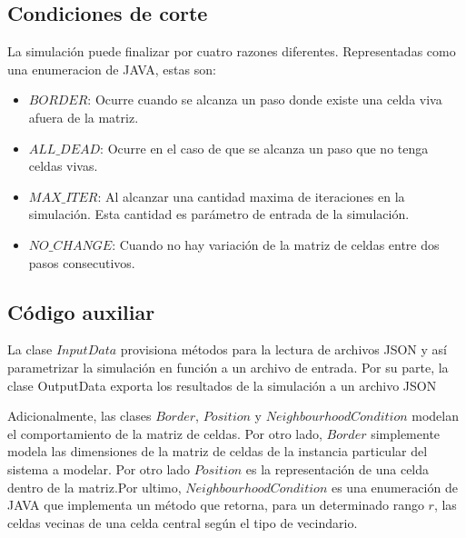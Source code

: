 \subsection{Condiciones de corte}\label{label:condiciones_de_corte}
    La simulación puede finalizar por cuatro razones diferentes. Representadas como una enumeracion de JAVA, estas son:
    \begin{itemize}
        \item $BORDER$: Ocurre cuando se alcanza un paso donde existe una celda viva afuera de la matriz.
        \item $ALL\_DEAD$: Ocurre en el caso de que se alcanza un paso que no tenga celdas vivas.
        \item $MAX\_ITER$: Al alcanzar una cantidad maxima de iteraciones en la simulación. Esta cantidad es parámetro de
            entrada de la simulación.
        \item $NO\_CHANGE$: Cuando no hay variación de la matriz de celdas entre dos pasos consecutivos.
    \end{itemize}

\subsection{Código auxiliar}\label{label:codigo_aux}
    La clase $InputData$ provisiona métodos para la lectura de archivos JSON y así parametrizar la 
    simulación en función a un archivo de entrada. Por su parte, la clase OutputData exporta los 
    resultados de la simulación a un archivo JSON

    Adicionalmente, las clases $Border$, $Position$ y $NeighbourhoodCondition$ modelan el comportamiento de la matriz de
    celdas. Por otro lado, $Border$ simplemente modela las dimensiones de la matriz de celdas de la instancia particular
    del sistema a modelar. Por otro lado $Position$ es la representación de una celda dentro de la matriz.Por ultimo,
    $NeighbourhoodCondition$ es una enumeración de JAVA que implementa un método que retorna, para un determinado rango
    $r$, las celdas vecinas de una celda central según el tipo de vecindario.